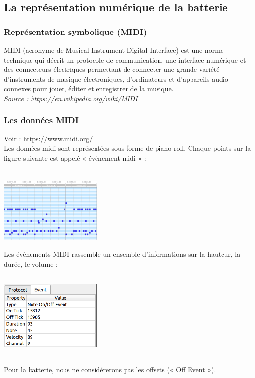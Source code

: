 \subsection*{La représentation numérique de la batterie}
\subsubsection{Représentation symbolique (MIDI)}
MIDI (acronyme de Musical Instrument Digital Interface) est une norme technique qui décrit un protocole de communication, une interface numérique et des connecteurs électriques permettant de connecter une grande variété d'instruments de musique électroniques, d'ordinateurs et d'appareils audio connexes pour jouer, éditer et enregistrer de la musique.\\
\textit{Source : \url{https://en.wikipedia.org/wiki/MIDI}}

\subsubsection{Les données MIDI}
Voir : \url{https://www.midi.org/}\\

Les données midi sont représentées sous forme de piano-roll. Chaque points sur la figure suivante est appelé « évènement midi » :\\\\
\includegraphics[height=40mm, width=50mm]{z_images/2_midi/representation_numerique_0.png}\\


Les évènements MIDI rassemble un ensemble d’informations sur la hauteur, la durée, le volume :\\\\
\includegraphics[height=40mm, width=50mm]{z_images/2_midi/representation_numerique_1.png}\\\\
Pour la batterie, nous ne considérerons pas les offsets (« Off Event »).

